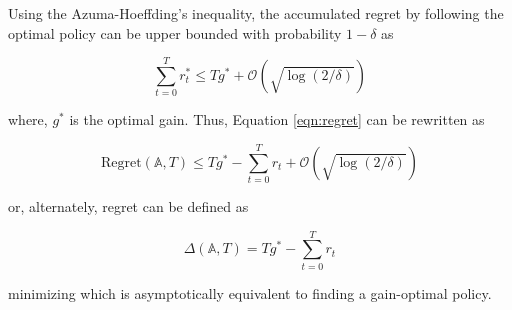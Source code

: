 Using the Azuma-Hoeffding's inequality, the accumulated regret by following the optimal policy can be upper bounded with probability $1 - \delta$ as

\begin{equation*}
    \sum_{t = 0}^T r^*_t \le T g^* + \mathcal{O}(\sqrt{\log(2/\delta)}) 
\end{equation*}

where, $g^*$ is the optimal gain. Thus, Equation \ref{eqn:regret} can be rewritten as

\begin{equation*}
    \text{Regret}(\mathbb{A}, T) \le T g^* - \sum_{t = 0}^T r_t + \mathcal{O}(\sqrt{\log(2/\delta)})
\end{equation*}

or, alternately, regret can be defined as

\begin{equation}
    \label{eqn:theogregret}
    \Delta(\mathbb{A}, T) =  T g^* - \sum_{t = 0}^T r_t
\end{equation}

minimizing which is asymptotically equivalent to finding a gain-optimal policy.


